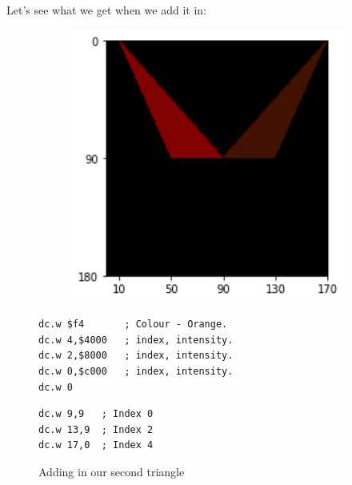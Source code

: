 Let's see what we get when we add it in:

\begin{figure}[H]
  \centering
  \begin{adjustbox}{width=13cm,center}
    \begin{minipage}[c]{0.48\linewidth}
      \begin{figure}[H]
        \centering
        \begin{adjustbox}{width=5.5cm,center}
          \includegraphics[width=12cm]{src/flipper/flipper_face_2.png}%
        \end{adjustbox}
      \end{figure}
    \end{minipage}
    \begin{minipage}[c]{0.48\linewidth}
      \begin{lstlisting}[basicstyle=\scriptsize\ttfamily]
dc.w $f4       ; Colour - Orange.
dc.w 4,$4000   ; index, intensity.
dc.w 2,$8000   ; index, intensity.
dc.w 0,$c000   ; index, intensity.
dc.w 0
      \end{lstlisting}
      \begin{lstlisting}[basicstyle=\scriptsize\ttfamily]
dc.w 9,9   ; Index 0
dc.w 13,9  ; Index 2
dc.w 17,0  ; Index 4
      \end{lstlisting}
      \vspace*{\fill}
    \end{minipage}
  \end{adjustbox}
  \caption{Adding in our second triangle}
\end{figure}

